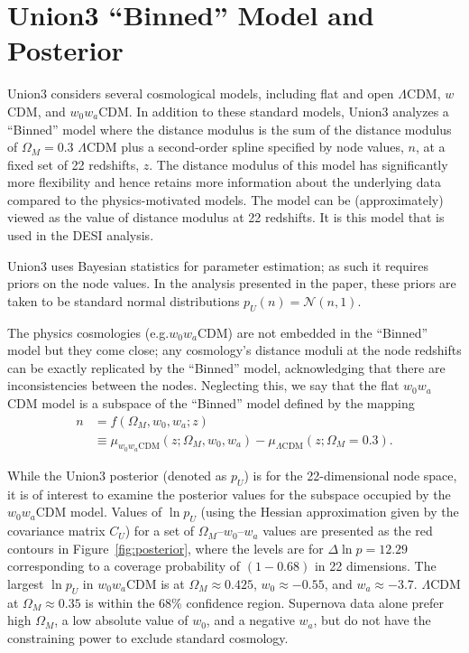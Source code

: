 \documentclass[11pt,a4paper]{article}
\begin{document}
\section{Union3 ``Binned'' Model and Posterior}
Union3 considers several cosmological models, including  flat and open $\Lambda$CDM, $w$CDM, and $w_0w_a$CDM.
In addition to these standard models,  Union3 analyzes a ``Binned'' model where the  distance modulus
is the sum of the distance modulus of $\Omega_M=0.3$  $\Lambda$CDM plus a second-order spline specified by node values, $n$,
at a fixed set of 22 redshifts, $z$.  The distance modulus of this model has significantly more flexibility 
and hence retains more information about the underlying data compared to the physics-motivated models.
The model can be (approximately) viewed as the value of distance modulus at 22 redshifts.
It is this model that is used in the DESI analysis.

Union3 uses Bayesian statistics for parameter estimation; as such it requires 
priors on the node values. In the analysis presented in the paper, these priors are taken to be standard normal distributions
$p_U(n)=  \mathcal{N}(n,1)$.

The physics cosmologies (e.g.$w_0w_a$CDM)  are not embedded in the ``Binned'' model but 
they come close; any cosmology's distance moduli at the node redshifts can be exactly replicated by the ``Binned'' model, acknowledging that
there are
inconsistencies between the nodes.  Neglecting this, we say that the flat $w_0w_a$CDM model
is a subspace of the ``Binned'' model defined by the mapping
\begin{align}
	n &= f(\Omega_M, w_0, w_a; z) \\
	& \equiv \mu_{w_0 w_a \text{CDM}}(z;\Omega_M, w_0, w_a)  - \mu_{\Lambda \text{CDM}}(z;\Omega_M=0.3).
\end{align}

While the Union3 posterior (denoted as $p_U$) is for the 22-dimensional node space, it is of interest to examine the posterior values for the
subspace occupied by the $w_0w_a$CDM
model. 
Values of $\ln{p_U}$ (using the Hessian approximation given by the covariance matrix $C_U$) for a
set of $\Omega_M$--$w_0$--$w_a$ values
 are presented as the red contours in Figure~\ref{fig:posterior}, where the levels are for  $\Delta \ln{p}=12.29$ corresponding to
a coverage probability of $(1-0.68)$ in 22 dimensions.
The largest $\ln{p_U}$ in $w_0w_a$CDM is at $\Omega_M\approx 0.425$, $w_0 \approx -0.55$, and $w_a \approx -3.7$. $\Lambda$CDM at $\Omega_M \approx 0.35$ is within the 68\% confidence region.
Supernova data alone prefer high $\Omega_M$, a low absolute value of $w_0$, and a negative $w_a$, but do not have
the constraining power to exclude standard cosmology.
\end{document}
